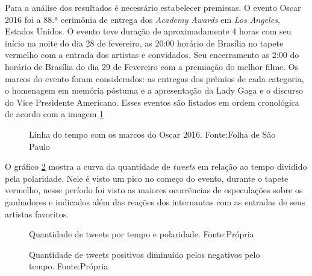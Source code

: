 Para a análise dos resultados é necessário estabelecer premissas. O evento Oscar 2016 foi a  88.ª cerimônia de entrega dos \textit{Academy Awards} em \textit{Los Angeles}, Estados Unidos. O evento teve duração de aproximadamente 4 horas com seu início na noite do dia 28 de fevereiro, as 20:00 horário de Brasília no tapete vermelho com a entrada dos artistas e convidados. Seu encerramento as 2:00 do horário de Brasília do dia 29 de Fevereiro com a premiação do melhor filme. Os marcos do evento foram considerados: as entregas dos prêmios de cada categoria, o homenagem em memória póstuma e a apresentação da Lady Gaga e o discurso do Vice Presidente Americano. Esses eventos  são listados em ordem cronológica de acordo com a imagem \ref{time}

\begin{figure}[!h]
	\centering{}
	\caption{Linha do tempo com os marcos do Oscar 2016. Fonte:Folha de São Paulo}
	\label{time}
\end{figure}
O gráfico \ref{qtd} mostra a curva da quantidade de \textit{tweets} em relação ao tempo  dividido pela polaridade. Nele é visto um pico  no começo do evento, durante o tapete vermelho, nesse período foi visto as maiores ocorrências de especulações sobre os ganhadores e indicados além das reações dos internautas com as entradas de seus artistas favoritos.

\begin{figure}[!h]
	\centering{}
	\caption{Quantidade de tweets por tempo e polaridade. Fonte:Própria}
	\label{qtd}
\end{figure}

\begin{figure}[!h]
	\centering{}
	\caption{Quantidade de tweets positivos diminuído pelos negativos pelo tempo. Fonte:Própria}
	\label{qtdnegpos}
\end{figure}

